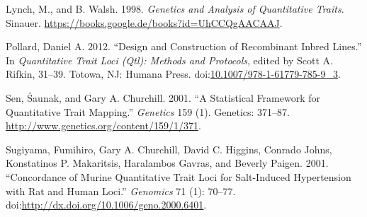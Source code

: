 \documentclass[12pt,]{book}
\theoremstyle{definition}
\theoremstyle{definition}
\theoremstyle{remark}
\begin{document}
\hypertarget{ref-lynch1998genetics}{}
Lynch, M., and B. Walsh. 1998. \emph{Genetics and Analysis of
Quantitative Traits}. Sinauer.
\url{https://books.google.de/books?id=UhCCQgAACAAJ}.

\hypertarget{ref-Pollard2012}{}
Pollard, Daniel A. 2012. ``Design and Construction of Recombinant Inbred
Lines.'' In \emph{Quantitative Trait Loci (Qtl): Methods and Protocols},
edited by Scott A. Rifkin, 31--39. Totowa, NJ: Humana Press.
doi:\href{https://doi.org/10.1007/978-1-61779-785-9_3}{10.1007/978-1-61779-785-9\_3}.

\hypertarget{ref-Sen371}{}
Sen, Śaunak, and Gary A. Churchill. 2001. ``A Statistical Framework for
Quantitative Trait Mapping.'' \emph{Genetics} 159 (1). Genetics:
371--87. \url{http://www.genetics.org/content/159/1/371}.

\hypertarget{ref-Sugiyama200170}{}
Sugiyama, Fumihiro, Gary A. Churchill, David C. Higgins, Conrado Johns,
Konstatinos P. Makaritsis, Haralambos Gavras, and Beverly Paigen. 2001.
``Concordance of Murine Quantitative Trait Loci for Salt-Induced
Hypertension with Rat and Human Loci.'' \emph{Genomics} 71 (1): 70--77.
doi:\href{https://doi.org/http://dx.doi.org/10.1006/geno.2000.6401}{http://dx.doi.org/10.1006/geno.2000.6401}.
\end{document}
